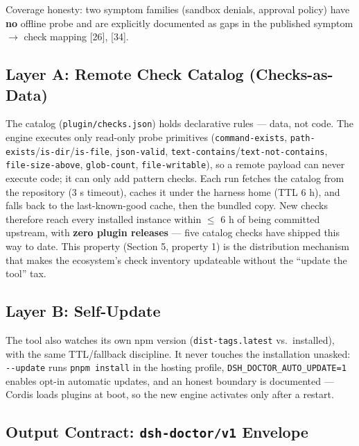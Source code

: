 \documentclass[11pt]{article}
\begin{document}
Coverage honesty: two symptom families (sandbox denials, approval
policy) have \textbf{no} offline probe and are explicitly documented as
gaps in the published symptom $\to$ check mapping [26], [34].

\subsection{Layer A: Remote Check Catalog
(Checks-as-Data)}\label{layer-a-remote-check-catalog-checks-as-data}

The catalog (\texttt{plugin/checks.json}) holds declarative rules ---
data, not code. The engine executes only read-only probe primitives
(\texttt{command-exists},
\texttt{path-exists}/\texttt{is-dir}/\texttt{is-file},
\texttt{json-valid}, \texttt{text-contains}/\texttt{text-not-contains},
\texttt{file-size-above}, \texttt{glob-count}, \texttt{file-writable}),
so a remote payload can never execute code; it can only add pattern
checks. Each run fetches the catalog from the repository (3 s timeout),
caches it under the harness home (TTL 6 h), and falls back to the
last-known-good cache, then the bundled copy. New checks therefore reach
every installed instance within  $\leq$ 6 h of being committed upstream, with
\textbf{zero plugin releases} --- five catalog checks have shipped this
way to date. This property (Section 5, property 1) is the distribution
mechanism that makes the ecosystem's check inventory updateable without
the ``update the tool'' tax.

\subsection{Layer B: Self-Update}\label{layer-b-self-update}

The tool also watches its own npm version (\texttt{dist-tags.latest}
vs.~installed), with the same TTL/fallback discipline. It never touches
the installation unasked: \texttt{-\/-update} runs
\texttt{pnpm\ install} in the hosting profile,
\texttt{DSH\_DOCTOR\_AUTO\_UPDATE=1} enables opt-in automatic updates,
and an honest boundary is documented --- Cordis loads plugins at boot,
so the new engine activates only after a restart.

\subsection{Output Contract: \texttt{dsh-doctor/v1} Envelope}\label{output-contract-dsh-doctorv1-envelope}
\end{document}
